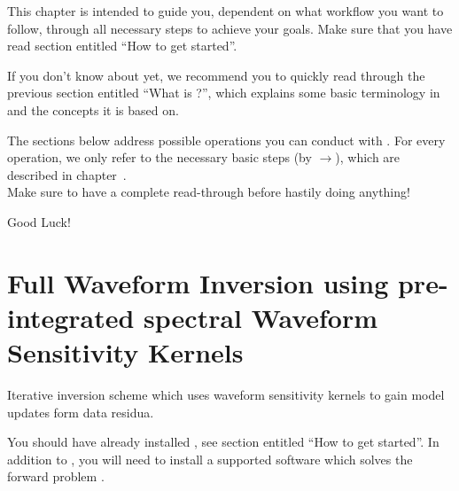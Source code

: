 
%
%
%
This chapter is intended to guide you, dependent on what workflow you want to follow, through all necessary steps
to achieve your goals. Make sure that you have read section entitled ``How to get started''. 

If you don't know about \ASKI{} yet, we recommend you to quickly read through the previous section 
entitled ``What is \ASKI{}?'', which explains some basic terminology in \ASKI{} and the concepts it is based on.

The sections below address possible operations you can conduct with \ASKI{}. For every operation, we only refer 
to the necessary basic steps (by $\rightarrow$), which are described in chapter~.\\
Make sure to have a complete read-through before hastily doing anything!

Good Luck!
%
%
\newpage
\section{Full Waveform Inversion using pre-integrated spectral Waveform Sensitivity Kernels} \label{guide,sec:classic_inversion}
%
%

Iterative inversion scheme which uses waveform sensitivity kernels to gain model updates form data residua.

You should have already installed \ASKI{}, see section entitled ``How to get started''. 
In addition to \ASKI{}, you will need to install a supported software which 
solves the forward problem .
%
